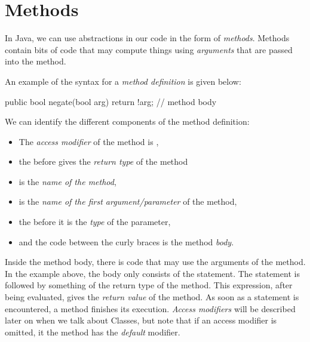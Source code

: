 



\section{Methods}\label{sec:methods}
In Java, we can use abstractions in our code in the form of \emph{methods}.
Methods contain bits of code that may compute things using \emph{arguments}
that are passed into the method.

An example of the syntax for a \emph{method definition} is given below:
\begin{code}
public bool negate(bool arg) {
  return !arg; // method body
}
\end{code}
We can identify the different components of the method definition:
\begin{itemize}
\item  The \emph{access modifier} of the method is ,
\item the  before  gives the \emph{return type} of the method
\item {} is the \emph{name of the method},
\item {} is the \emph{name of the first argument/parameter} of the method,
\item the  before  it is the \emph{type} of the  parameter,
\item and the code between the curly braces is the method \emph{body}.
\end{itemize}
Inside the method body, there is code that may use the arguments of the method.
In the example above, the body only consists of the  statement.
The  statement is followed by something of the return type of the method.
This expression, after being evaluated, gives the \emph{return value} of the method.
As soon as a  statement is encountered, a method finishes its execution.
\emph{Access modifiers} will be described later on when we talk about Classes,
but note that if an access modifier is omitted, it the method has the \emph{default} modifier.


